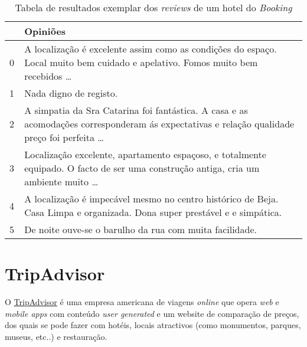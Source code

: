 \begin{table}[!ht]
  \centering
  \begin{adjustbox}{width=\columnwidth,center}
    \begin{tabular}{|l|l|}
      \hline
      ~     & Opiniões                                                                                                                                     \\ \hline
      0     & A localização é excelente assim como as condições do espaço. Local muito bem cuidado e apelativo. Fomos muito bem recebidos \dots            \\ \hline
      1     & Nada digno de registo.                                                                                                                       \\ \hline
      2     & A simpatia da Sra Catarina foi fantástica. A casa e as acomodações corresponderam ás expectativas e relação qualidade preço foi perfeita \ldots \\ \hline
      3     & Localização excelente, apartamento espaçoso, e totalmente equipado.
      O facto de ser uma construção antiga, cria um ambiente muito \ldots                                                                                  \\ \hline
      4     & A localização é impecável mesmo no centro histórico de Beja. Casa Limpa e organizada. Dona super prestável e e simpática.                    \\ \hline
      5     & De noite ouve-se o barulho da rua com muita facilidade.                                                                                      \\ \hline
    \end{tabular}
  \end{adjustbox}
  \caption{Tabela de resultados exemplar dos \textit{reviews} de um hotel do \textit{Booking}}
  \label{table:3}
\end{table}

\section{TripAdvisor}

O \href{https://www.tripadvisor.pt/}{TripAdvisor} é uma empresa americana de viagens \textit{online} que opera \textit{web} e \textit{mobile apps} com conteúdo \textit{user generated} e um website de comparação de preços, dos quais se pode fazer com hotéis, locais atractivos (como monumentos, parques, museus, etc..) e restauração.


